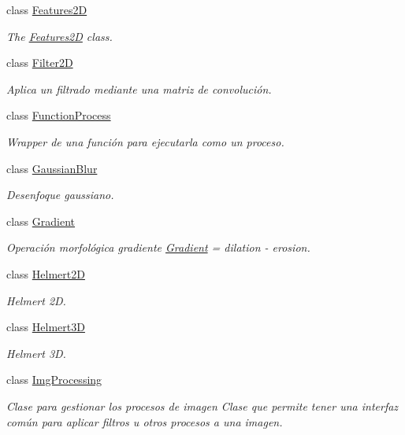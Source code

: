 \begin{DoxyCompactItemize}
class \hyperlink{class_i3_d_1_1_features2_d}{Features2D}
\begin{DoxyCompactList}\small\item\em The \hyperlink{class_i3_d_1_1_features2_d}{Features2D} class. \end{DoxyCompactList}\item 
class \hyperlink{class_i3_d_1_1_filter2_d}{Filter2D}
\begin{DoxyCompactList}\small\item\em Aplica un filtrado mediante una matriz de convolución. \end{DoxyCompactList}\item 
class \hyperlink{class_i3_d_1_1_function_process}{Function\+Process}
\begin{DoxyCompactList}\small\item\em Wrapper de una función para ejecutarla como un proceso. \end{DoxyCompactList}\item 
class \hyperlink{class_i3_d_1_1_gaussian_blur}{Gaussian\+Blur}
\begin{DoxyCompactList}\small\item\em Desenfoque gaussiano. \end{DoxyCompactList}\item 
class \hyperlink{class_i3_d_1_1_gradient}{Gradient}
\begin{DoxyCompactList}\small\item\em Operación morfológica gradiente \hyperlink{class_i3_d_1_1_gradient}{Gradient} = dilation -\/ erosion. \end{DoxyCompactList}\item 
class \hyperlink{class_i3_d_1_1_helmert2_d}{Helmert2D}
\begin{DoxyCompactList}\small\item\em Helmert 2D. \end{DoxyCompactList}\item 
class \hyperlink{class_i3_d_1_1_helmert3_d}{Helmert3D}
\begin{DoxyCompactList}\small\item\em Helmert 3D. \end{DoxyCompactList}\item 
class \hyperlink{class_i3_d_1_1_img_processing}{Img\+Processing}
\begin{DoxyCompactList}\small\item\em Clase para gestionar los procesos de imagen Clase que permite tener una interfaz común para aplicar filtros u otros procesos a una imagen. \end{DoxyCompactList}\item 

\end{DoxyCompactItemize}
